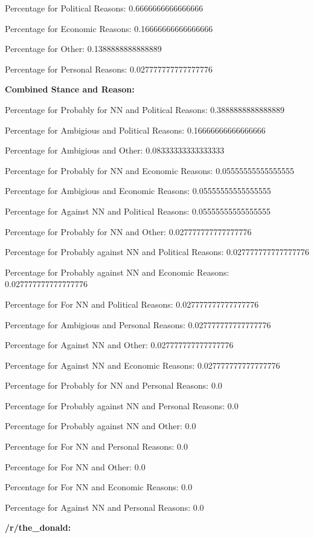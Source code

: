 \documentclass[11pt]{article}
\begin{document}
	Percentage for Political Reasons: 0.6666666666666666
	
	Percentage for Economic Reasons: 0.16666666666666666
	
	Percentage for Other: 0.1388888888888889
	
	Percentage for Personal Reasons: 0.027777777777777776
	
	\textbf{Combined Stance and Reason:}
	
	Percentage for Probably for NN and Political Reasons: 0.3888888888888889
	
	Percentage for Ambigious and Political Reasons: 0.16666666666666666
	
	Percentage for Ambigious and Other: 0.08333333333333333
	
	Percentage for Probably for NN and Economic Reasons: 0.05555555555555555
	
	Percentage for Ambigious and Economic Reasons: 0.05555555555555555
	
	Percentage for Against NN and Political Reasons: 0.05555555555555555
	
	Percentage for Probably for NN and Other: 0.027777777777777776
	
	Percentage for Probably against NN and Political Reasons: 0.027777777777777776
	
	Percentage for Probably against NN and Economic Reasons: 0.027777777777777776
	
	Percentage for For NN and Political Reasons: 0.027777777777777776
	
	Percentage for Ambigious and Personal Reasons: 0.027777777777777776
	
	Percentage for Against NN and Other: 0.027777777777777776
	
	Percentage for Against NN and Economic Reasons: 0.027777777777777776
	
	Percentage for Probably for NN and Personal Reasons: 0.0
	
	Percentage for Probably against NN and Personal Reasons: 0.0
	
	Percentage for Probably against NN and Other: 0.0
	
	Percentage for For NN and Personal Reasons: 0.0
	
	Percentage for For NN and Other: 0.0
	
	Percentage for For NN and Economic Reasons: 0.0
	
	Percentage for Against NN and Personal Reasons: 0.0
	
	\textbf{/r/the\_donald:}
	
\end{document}
